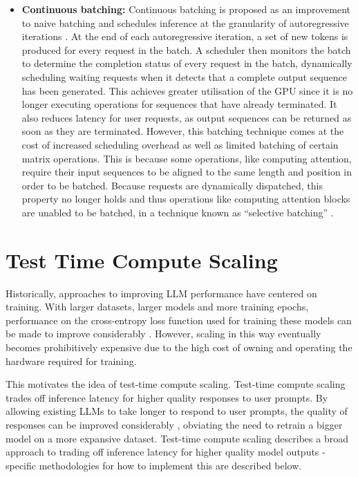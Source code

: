 \documentclass[11pt,twoside]{report}
\begin{document}
\begin{itemize}
  \item \textbf{Continuous batching:} Continuous batching is proposed as an improvement to naive batching and schedules inference at the granularity of autoregressive iterations \cite{yu2022orca}.
    At the end of each autoregressive iteration, a set of new tokens is produced for every request in the batch.    
    A scheduler then monitors the batch to determine the completion status of every request in the batch, dynamically scheduling waiting requests when it detects that a complete output sequence has been generated.
    This achieves greater utilisation of the GPU since it is no longer executing operations for sequences that have already terminated.
    It also reduces latency for user requests, as output sequences can be returned as soon as they are terminated.
    However, this batching technique comes at the cost of increased scheduling overhead as well as limited batching of certain matrix operations.
    This is because some operations, like computing attention, require their input sequences to be aligned to the same length and position in order to be batched.
    Because requests are dynamically dispatched, this property no longer holds and thus operations like computing attention blocks are unabled to be batched, in a technique known as ``selective batching'' \cite{yu2022orca}.
\end{itemize}

\section{Test Time Compute Scaling}\label{section:testtimecompute}
Historically, approaches to improving LLM performance have centered on training. 
With larger datasets, larger models and more training epochs, performance on the cross-entropy loss function used for training these models can be made to improve considerably \cite{kaplan2020scaling}.  
However, scaling in this way eventually becomes prohibitively expensive due to the high cost of owning and operating the hardware required for training.

This motivates the idea of test-time compute scaling.
Test-time compute scaling trades off inference latency for higher quality responses to user prompts. 
By allowing existing LLMs to take longer to respond to user prompts, the quality of responses can be improved considerably \cite{snell2024scaling}, obviating the need to retrain a bigger model on a more expansive dataset.
Test-time compute scaling describes a broad approach to trading off inference latency for higher quality model outputs - specific methodologies for how to implement this are described below.
\end{document}
